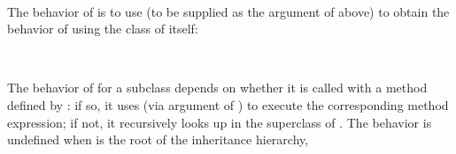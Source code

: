 \begin{AgdaAlign}
\begin{code}
\AgdaSymbol{:}\AgdaSpace{}%
\AgdaSpace{}%
\AgdaSpace{}%
\<%
\\
%
\>[4]%
\>[353I]\AgdaSymbol{(}\AgdaSpace{}%
\AgdaOperator{\AgdaInductiveConstructor{,}}\AgdaSpace{}%
\AgdaSpace{}%
\AgdaOperator{\AgdaInductiveConstructor{,}}\AgdaSpace{}%
\AgdaSymbol{)}\AgdaSpace{}%
\AgdaSymbol{=}\AgdaSpace{}%
\AgdaSymbol{(}\AgdaSpace{}%
\AgdaOperator{\AgdaInductiveConstructor{,}}\AgdaSpace{}%
\AgdaSpace{}%
\AgdaOperator{\AgdaInductiveConstructor{,}}\AgdaSpace{}%
\AgdaSymbol{)}\AgdaSpace{}%
\<%
\end{code}
%
The behavior of  is to use  
(to be supplied as the argument  of  above)
to obtain the behavior of  using the class of  itself:
%
\begin{code}%
\>[.][@{}l@{}]\<[353I]%
\>[6]\AgdaSpace{}%
\AgdaSymbol{:}\AgdaSpace{}%
\AgdaSpace{}%
\AgdaSpace{}%
\AgdaSpace{}%
\AgdaSpace{}%
\<%
\\
%
\>[6]\AgdaSpace{}%
\AgdaSpace{}%
\AgdaSymbol{=}\AgdaSpace{}%
\AgdaSpace{}%
\AgdaSymbol{(}\AgdaSpace{}%
\AgdaSymbol{)}\AgdaSpace{}%
\<%
\end{code}
%
The behavior of  for a subclass  
depends on whether it is called with a method  defined by :
if so, it uses  (via argument  of )
to execute the corresponding method expression;
if not, it recursively looks up  in the superclass of .
The behavior is undefined when  is the root of the inheritance hierarchy,

\end{AgdaAlign}
